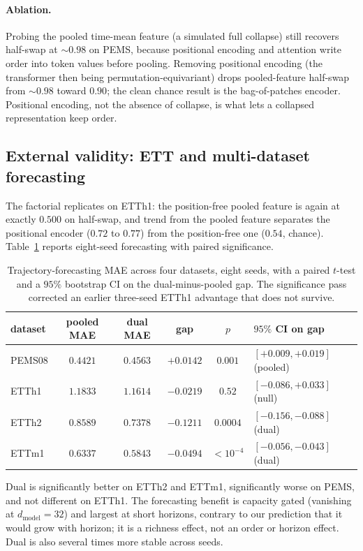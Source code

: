 \documentclass[11pt]{article}
\begin{document}
\paragraph{Ablation.} Probing the pooled time-mean feature (a simulated full collapse) still
recovers half-swap at $\sim0.98$ on PEMS, because positional encoding and attention write order into
token values before pooling. Removing positional encoding (the transformer then being
permutation-equivariant) drops pooled-feature half-swap from $\sim0.98$ toward $0.90$; the clean
chance result is the bag-of-patches encoder. Positional encoding, not the absence of collapse, is
what lets a collapsed representation keep order.

\subsection{External validity: ETT and multi-dataset forecasting}

The factorial replicates on ETTh1: the position-free pooled feature is again at exactly $0.500$ on
half-swap, and trend from the pooled feature separates the positional encoder ($0.72$ to $0.77$)
from the position-free one ($0.54$, chance). Table~\ref{tab:forecast} reports eight-seed forecasting
with paired significance.

\begin{table}[t]
\centering\small
\caption{Trajectory-forecasting MAE across four datasets, eight seeds, with a paired $t$-test and a
$95\%$ bootstrap CI on the dual-minus-pooled gap. The significance pass corrected an earlier
three-seed ETTh1 advantage that does not survive.}
\label{tab:forecast}
\begin{tabular}{l ccccl}
\toprule
dataset & pooled MAE & dual MAE & gap & $p$ & $95\%$ CI on gap \\
\midrule
PEMS08 & $0.4421$ & $0.4563$ & $+0.0142$ & $0.001$ & $[+0.009,+0.019]$ (pooled) \\
ETTh1  & $1.1833$ & $1.1614$ & $-0.0219$ & $0.52$  & $[-0.086,+0.033]$ (null) \\
ETTh2  & $0.8589$ & $0.7378$ & $-0.1211$ & $0.0004$& $[-0.156,-0.088]$ (dual) \\
ETTm1  & $0.6337$ & $0.5843$ & $-0.0494$ & $<10^{-4}$ & $[-0.056,-0.043]$ (dual) \\
\bottomrule
\end{tabular}
\end{table}

Dual is significantly better on ETTh2 and ETTm1, significantly worse on PEMS, and not different on
ETTh1. The forecasting benefit is capacity gated (vanishing at $d_{\text{model}}=32$) and largest at
short horizons, contrary to our prediction that it would grow with horizon; it is a richness effect,
not an order or horizon effect. Dual is also several times more stable across seeds.
\end{document}

